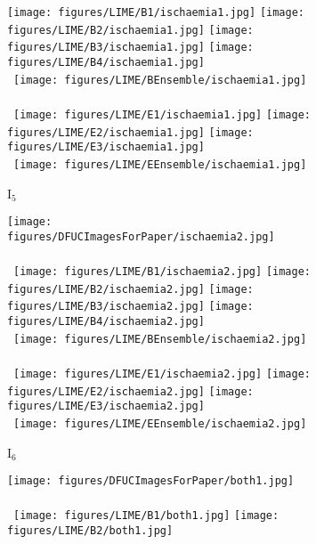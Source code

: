 \documentclass[runningheads]{llncs}
\begin{document}
\begin{figure}[ht!]
\begin{subfigure}[b]{0.10\textwidth}
        \texttt{[image: figures/LIME/B1/ischaemia1.jpg]} 
        \texttt{[image: figures/LIME/B2/ischaemia1.jpg]} 
        \texttt{[image: figures/LIME/B3/ischaemia1.jpg]} 
        \texttt{[image: figures/LIME/B4/ischaemia1.jpg]}\\\ 
        \texttt{[image: figures/LIME/BEnsemble/ischaemia1.jpg]}\\\ \\\ 
        \texttt{[image: figures/LIME/E1/ischaemia1.jpg]} 
        \texttt{[image: figures/LIME/E2/ischaemia1.jpg]} 
        \texttt{[image: figures/LIME/E3/ischaemia1.jpg]}\\\ 
        \texttt{[image: figures/LIME/EEnsemble/ischaemia1.jpg]}
        \caption{I$_5$}
        \label{fig:lime_i5}
    \end{subfigure}
    \hfill
    \begin{subfigure}[b]{0.10\textwidth}
        \centering
        \texttt{[image: figures/DFUCImagesForPaper/ischaemia2.jpg]}\\\ \\\ 
        \texttt{[image: figures/LIME/B1/ischaemia2.jpg]}
        \texttt{[image: figures/LIME/B2/ischaemia2.jpg]} 
        \texttt{[image: figures/LIME/B3/ischaemia2.jpg]} 
        \texttt{[image: figures/LIME/B4/ischaemia2.jpg]}\\\ 
        \texttt{[image: figures/LIME/BEnsemble/ischaemia2.jpg]}\\\ \\\ 
        \texttt{[image: figures/LIME/E1/ischaemia2.jpg]} 
        \texttt{[image: figures/LIME/E2/ischaemia2.jpg]} 
        \texttt{[image: figures/LIME/E3/ischaemia2.jpg]}\\\ 
        \texttt{[image: figures/LIME/EEnsemble/ischaemia2.jpg]}
        \caption{I$_6$}
        \label{fig:lime_i6}
    \end{subfigure}
    \hfill
    \begin{subfigure}[b]{0.10\textwidth}
        \centering
        \texttt{[image: figures/DFUCImagesForPaper/both1.jpg]}\\\ \\\ 
        \texttt{[image: figures/LIME/B1/both1.jpg]} 
        \texttt{[image: figures/LIME/B2/both1.jpg]} 

\end{subfigure}
\end{figure}
\end{document}

